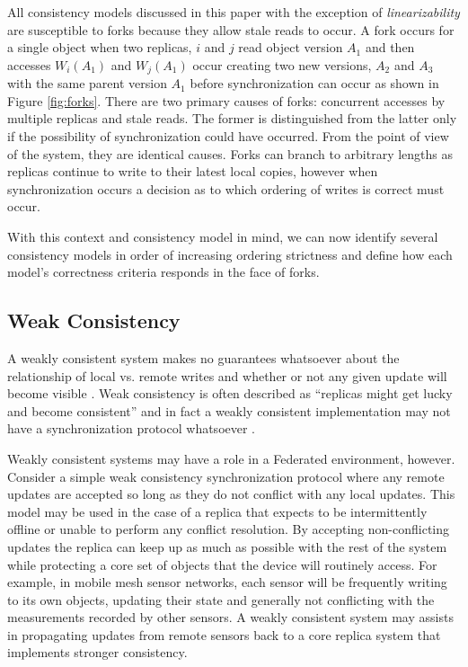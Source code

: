 \documentclass[10pt,conference,compsocconf,letterpaper]{IEEEtran}
\begin{document}
All consistency models discussed in this paper with the exception of \textit{linearizability} are susceptible to forks because they allow stale reads to occur. A fork occurs for a single object when two replicas, $i$ and $j$ read object version $A_1$ and then accesses $W_i(A_1)$ and $W_j(A_1)$ occur creating two new versions, $A_2$ and $A_3$ with the same parent version $A_1$ before synchronization can occur as shown in Figure \ref{fig:forks}. There are two primary causes of forks: concurrent accesses by multiple replicas and stale reads. The former is distinguished from the latter only if the possibility of synchronization could have occurred. From the point of view of the system, they are identical causes. Forks can branch to arbitrary lengths as replicas continue to write to their latest local copies, however when synchronization occurs a decision as to which ordering of writes is correct must occur.

With this context and consistency model in mind, we can now identify several consistency models in order of increasing ordering strictness and define how each model's correctness criteria responds in the face of forks.

\subsection{Weak Consistency}

A weakly consistent system makes no guarantees whatsoever about the relationship of local vs. remote writes and whether or not any given update will become visible \cite{vogels_eventually_2009}. Weak consistency is often described as ``replicas might get lucky and become consistent'' and in fact a weakly consistent implementation may not have a synchronization protocol whatsoever \cite{bermbach_consistency_2013}.

Weakly consistent systems may have a role in a Federated environment, however. Consider a simple weak consistency synchronization protocol where any remote updates are accepted so long as they do not conflict with any local updates. This model may be used in the case of a replica that expects to be intermittently offline or unable to perform any conflict resolution. By accepting non-conflicting updates the replica can keep up as much as possible with the rest of the system while protecting a core set of objects that the device will routinely access. For example, in mobile mesh sensor networks, each sensor will be frequently writing to its own objects, updating their state and generally not conflicting with the measurements recorded by other sensors. A weakly consistent system may assists in propagating updates from remote sensors back to a core replica system that implements stronger consistency.
\end{document}
